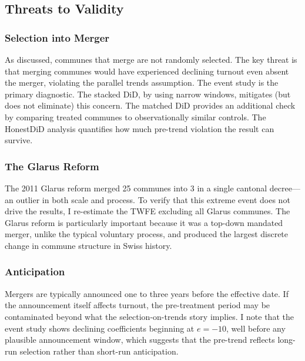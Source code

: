 \documentclass[12pt]{article}
\begin{document}
\subsection{Threats to Validity}

\subsubsection{Selection into Merger}

As discussed, communes that merge are not randomly selected. The key threat is that merging communes would have experienced declining turnout even absent the merger, violating the parallel trends assumption. The event study is the primary diagnostic. The stacked DiD, by using narrow windows, mitigates (but does not eliminate) this concern. The matched DiD provides an additional check by comparing treated communes to observationally similar controls. The HonestDiD analysis quantifies how much pre-trend violation the result can survive.

\subsubsection{The Glarus Reform}

The 2011 Glarus reform merged 25 communes into 3 in a single cantonal decree---an outlier in both scale and process. To verify that this extreme event does not drive the results, I re-estimate the TWFE excluding all Glarus communes. The Glarus reform is particularly important because it was a top-down mandated merger, unlike the typical voluntary process, and produced the largest discrete change in commune structure in Swiss history.

\subsubsection{Anticipation}

Mergers are typically announced one to three years before the effective date. If the announcement itself affects turnout, the pre-treatment period may be contaminated beyond what the selection-on-trends story implies. I note that the event study shows declining coefficients beginning at $e = -10$, well before any plausible announcement window, which suggests that the pre-trend reflects long-run selection rather than short-run anticipation.


\end{document}
